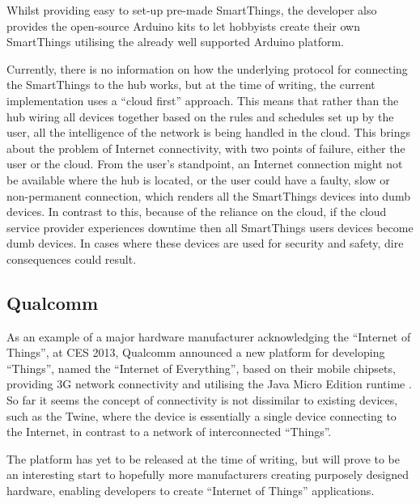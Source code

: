 Whilst providing easy to set-up pre-made SmartThings, the developer also provides the open-source Arduino kits to let hobbyists create their own SmartThings utilising the already well supported Arduino platform.

Currently, there is no information on how the underlying protocol for connecting the SmartThings to the hub works, but at the time of writing, the current implementation uses a ``cloud first'' approach. This means that rather than the hub wiring all devices together based on the rules and schedules set up by the user, all the intelligence of the network is being handled in the cloud. This brings about the problem of Internet connectivity, with two points of failure, either the user or the cloud. From the user's standpoint, an Internet connection might not be available where the hub is located, or the user could have a faulty, slow or non-permanent connection, which renders all the SmartThings devices into dumb devices. In contrast to this, because of the reliance on the cloud, if the cloud service provider experiences downtime then all SmartThings users devices become dumb devices. In cases where these devices are used for security and safety, dire consequences could result.
  



\subsection{Qualcomm} %
\label{sub:qualcomm}
As an example of a major hardware manufacturer acknowledging the ``Internet of Things'', at CES 2013, Qualcomm announced a new platform for developing ``Things'', named the ``Internet of Everything'', based on their mobile chipsets, providing 3G network connectivity and utilising the Java Micro Edition runtime \cite{Qualcomm}. So far it seems the concept of connectivity is not dissimilar to existing devices, such as the Twine, where the device is essentially a single device connecting to the Internet, in contrast to a network of interconnected ``Things''.

The platform has yet to be released at the time of writing, but will prove to be an interesting start to hopefully more manufacturers creating purposely designed hardware, enabling developers to create ``Internet of Things'' applications.



